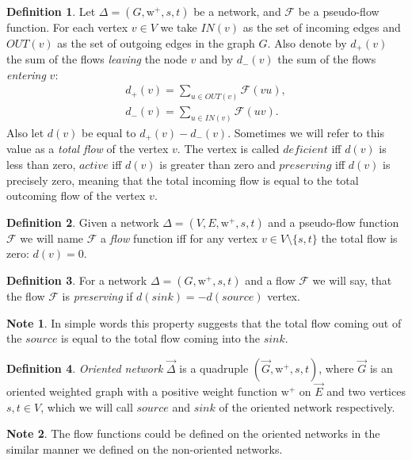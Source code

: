 \documentclass[12pt]{article}
\theoremstyle{definition}
\newtheorem*{note}{Note}
\newtheorem{definition}{Definition}
\newcommand{\wtp}{\mathrm{w}^{+}}
\newcommand{\flow}{\mathcal{F}}
\newcommand{\source}{\mathit{source}}
\newcommand{\sink}{\mathit{sink}}
\newcommand{\net}{\Delta}
\newcommand{\onet}{\vec{\Delta}}
\numberwithin{remark}{section}
\numberwithin{theorem}{section}
\numberwithin{prop}{section}
\numberwithin{equation}{section}
\numberwithin{lemma}{section}
\numberwithin{prop_under_lemma}{lemma}
\begin{document}
    \begin{definition}
      Let $\net = (G, \wtp, s, t)$ be a network, and $\flow$ be a pseudo-flow function.
      For each vertex $v \in V$ we take $IN(v)$ as the set of incoming edges
      and $OUT(v)$ as the set of outgoing edges in the graph $G$.
      Also denote by $d_{+}(v)$ the sum of the flows \emph{leaving} the node $v$ and by
      $d_{-}(v)$ the sum of the flows \emph{entering} $v$:
      \begin{align*}
          d_{+}(v) = \sum_{u \in OUT(v)} \flow(vu),\\
          d_{-}(v) = \sum_{u \in IN(v)} \flow(uv).
      \end{align*}
      Also let $d(v)$ be equal to $d_{+}(v) - d_{-}(v)$. Sometimes we will refer to this value as
      a \emph{total flow} of the vertex $v$.
      The vertex is called $deficient$ iff $d(v)$ is less than zero,
      $active$ iff $d(v)$ is greater than zero and
      $preserving$ iff $d(v)$ is precisely zero, meaning that the total incoming flow
      is equal to the total outcoming flow of the vertex $v$.
    \end{definition}
    \begin{definition}
      Given a network $\net = (V, E, \wtp, s, t)$ and a pseudo-flow function $\flow$ we will name $\flow$ a
        \emph{flow} function iff for any vertex $v \in V \setminus \{s,t\}$ the total flow is zero: $d(v) = 0$.
    \end{definition}
    \begin{definition}
      For a network $\net = (G, \wtp, s, t)$ and a flow $\flow$ we will say,
      that the flow $\flow$ is \emph{preserving} if $d(\sink) = -d(\source)$ vertex.
    \end{definition}
    \begin{note}
      In simple words this property suggests
        that the total flow coming out of the $\source$ is equal to the total flow
        coming into the $\sink$.
    \end{note}
    \begin{definition}
      \emph{Oriented network} $\onet$ is a quadruple $(\vec{G}, \wtp, s, t)$, where
        $\vec{G}$ is an oriented weighted graph with 
        a positive weight function $\wtp$ on $\vec{E}$ and two vertices $s, t \in V$, which
        we will call $\source$ and $\sink$ of the oriented network respectively.
    \end{definition}
    \begin{note}
      The flow functions could be defined on the oriented networks in the similar manner
      we defined on the non-oriented networks.
    \end{note}
\end{document}
